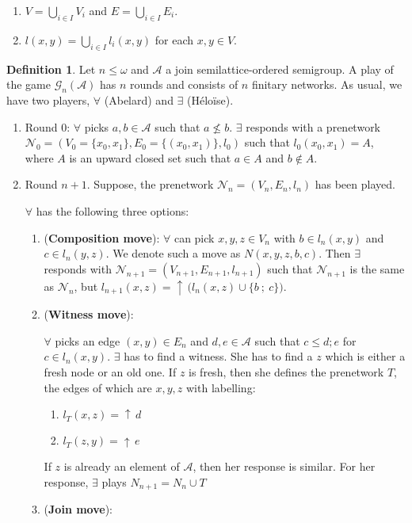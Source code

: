 \documentclass[a4paper]{article}
\theoremstyle{definition}
\newtheorem{definition}{Definition}
\theoremstyle{theorem}
\theoremstyle{proposition}
\theoremstyle{lemma}
\theoremstyle{ex}
\theoremstyle{corollary}
\theoremstyle{claim}
\newcommand{\up}[1]{\ensuremath{{\uparrow}\,#1}}
\begin{document}
\begin{enumerate}
  \item $V = \bigcup \limits_{i \in I} V_i$ and $E = \bigcup \limits_{i \in I} E_i$.
  \item $l(x, y) = \bigcup \limits_{ i \in I } l_i(x, y)$ for each $x, y \in V$.
\end{enumerate}

\begin{definition}
  Let $n \leq \omega$ and $\mathcal{A}$ a join semilattice-ordered semigroup. A play of the game $\mathcal{G}_n(\mathcal{A})$ has $n$ rounds and consists of $n$ finitary networks. As usual, we have two players, $\forall$ (Abelard) and $\exists$ (H\'{e}lo\"{i}se).

  \begin{enumerate}
    \item Round $0$: $\forall$ picks $a, b \in \mathcal{A}$ such that $a \not\leq b$. $\exists$ responds with a prenetwork $\mathcal{N}_0 = (V_0 = \{ x_0, x_1 \}, E_0 = \{ (x_0, x_1)\}, l_0)$ such that $l_0(x_0, x_1) = A$, where $A$ is an upward closed set such that $a \in A$ and $b \notin A$.
    \item Round $n + 1$. Suppose, the prenetwork $\mathcal{N}_n = (V_n, E_n, l_n)$ has been played.

    $\forall$ has the following three options:
    \begin{enumerate}
      \item ({\bf Composition move}): $\forall$ can pick $x, y, z \in V_n$ with $b \in l_n(x, y)$ and $c \in l_n(y, z)$. We denote such a move as $N(x,y,z,b,c)$. Then $\exists$ responds with $\mathcal{N}_{n + 1} = (V_{n + 1}, E_{n + 1}, l_{n + 1})$ such that $\mathcal{N}_{n + 1}$
      is the same as $\mathcal{N}_n$, but $l_{n + 1}(x, z) = \up{(l_{n}(x, z)} \cup \{ b \: ; \: c \})$.
      \item ({\bf Witness move}):

      $\forall$ picks an edge $(x, y) \in E_n$ and $d, e \in \mathcal{A}$ such that $c \leq d ; e$ for $c \in l_n(x, y)$. $\exists$ has to find a witness. She has to find a $z$ which is either a fresh node or an old one. If $z$ is fresh, then she defines the prenetwork $T$, the edges of which are $x, y, z$ with labelling:
      \begin{enumerate}
        \item $l_T(x, z) = \up{d}$
        \item $l_T(z, y) = \up{e}$
      \end{enumerate}
      If $z$ is already an element of $\mathcal{A}$, then her response is similar.
      For her response, $\exists$ plays $N_{n + 1} = N_n \cup T$
      \item ({\bf Join move}):


\end{enumerate}
\end{enumerate}
\end{definition}
\end{document}
